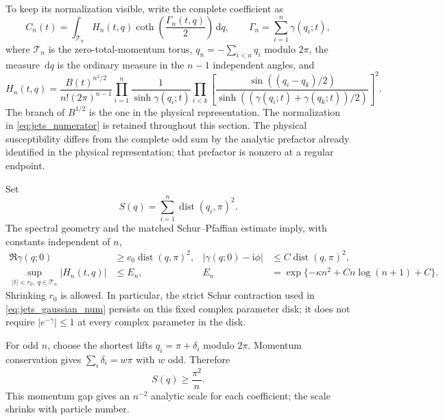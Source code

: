\documentclass[11pt]{article}
\numberwithin{equation}{section}
\theoremstyle{definition}
\newcommand{\dd}{\,\mathrm d}
\newcommand{\ii}{\mathrm i}
\newcommand{\dist}{\operatorname{dist}}
\begin{document}
To keep its normalization visible, write the complete coefficient as
\begin{equation}\label{eq:jets_full_coefficient}
 C_n(t)=\int_{\mathcal T_n}H_n(t,q)
        \coth\!\left(\frac{\Gamma_n(t,q)}2\right)\dd q,
 \qquad \Gamma_n=\sum_{i=1}^n\gamma(q_i;t),
\end{equation}
where $\mathcal T_n$ is the zero-total-momentum torus,
$q_n=-\sum_{i<n}q_i$ modulo $2\pi$, the measure $\dd q$ is the
ordinary measure in the $n-1$ independent angles, and
\begin{equation}\label{eq:jets_numerator}
 H_n(t,q)=\frac{B(t)^{n^2/2}}{n!(2\pi)^{n-1}}
 \prod_{i=1}^n\frac1{\sinh\gamma(q_i;t)}
 \prod_{i<k}\left[
  \frac{\sin((q_i-q_k)/2)}
       {\sinh((\gamma(q_i;t)+\gamma(q_k;t))/2)}
 \right]^2.
\end{equation}
The branch of $B^{1/2}$ is the one in the physical representation. The
normalization in \eqref{eq:jets_numerator} is retained throughout this
section. The physical susceptibility differs from the complete odd sum
by the analytic prefactor already identified in the physical
representation; that prefactor is nonzero at a regular endpoint.

Set
\[
 S(q)=\sum_{i=1}^n\dist(q_i,\pi)^2.
\]
The spectral geometry and the matched Schur--Pfaffian estimate imply,
with constants independent of $n$,
\begin{align}
 \Re\gamma(q;0)&\ge c_0\dist(q,\pi)^2,
 &|\gamma(q;0)-\ii\phi|&\le C\dist(q,\pi)^2,\label{eq:jets_attenuation0}\\
 \sup_{|t|<r_0,\ q\in\mathcal T_n}|H_n(t,q)|
 &\le E_n,
 &E_n&=\exp\{-\kappa n^2+C n\log(n+1)+C\}.
 \label{eq:jets_gaussian_num}
\end{align}
Shrinking $r_0$ is allowed. In particular, the strict Schur contraction
used in \eqref{eq:jets_gaussian_num} persists on this fixed complex
parameter disk; it does not require $|e^{-\gamma}|\le1$ at every
complex parameter in the disk.

For odd $n$, choose the shortest lifts $q_i=\pi+\delta_i$ modulo
$2\pi$. Momentum conservation gives
$\sum_i\delta_i=w\pi$ with $w$ odd. Therefore
\begin{equation}\label{eq:jets_momentum_minimum}
 S(q)\ge\frac{\pi^2}{n}.
\end{equation}
This momentum gap gives an $n^{-2}$ analytic scale for each coefficient;
the scale shrinks with particle number.
\end{document}
